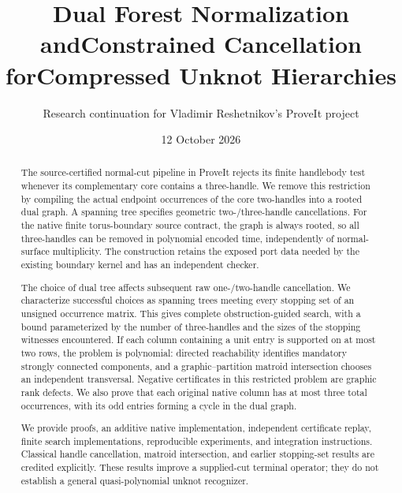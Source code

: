 \documentclass[11pt]{article}
\title{\color{navy}\bfseries Dual Forest Normalization and\newline Constrained Cancellation for\newline Compressed Unknot Hierarchies}
\author{Research continuation for Vladimir Reshetnikov's ProveIt project}
\date{12 October 2026}
\theoremstyle{definition}
\begin{document}
\maketitle
\begin{abstract}
The source-certified normal-cut pipeline in ProveIt rejects its finite
handlebody test whenever its complementary core contains a three-handle.
We remove this restriction by compiling the actual endpoint occurrences of
the core two-handles into a rooted dual graph.  A spanning tree specifies
geometric two-/three-handle cancellations.  For the native finite
torus-boundary source contract, the graph is always rooted, so all
three-handles can be removed in polynomial encoded time, independently of
normal-surface multiplicity.  The construction retains the exposed port
data needed by the existing boundary kernel and has an independent checker.

The choice of dual tree affects subsequent raw one-/two-handle cancellation.
We characterize successful choices as spanning trees meeting every stopping
set of an unsigned occurrence matrix.  This gives complete obstruction-guided
search, with a bound parameterized by the number of three-handles and the
sizes of the stopping witnesses encountered.  If each column containing
a unit entry is supported on at most two rows, the problem is polynomial: directed
reachability identifies mandatory strongly connected components, and a
graphic--partition matroid intersection chooses an independent transversal.
Negative certificates in this restricted problem are graphic rank defects.
We also prove that each original native column has at most three total
occurrences, with its odd entries forming a cycle in the dual graph.

We provide proofs, an additive native implementation, independent
certificate replay, finite search implementations, reproducible experiments,
and integration instructions.  Classical handle cancellation, matroid
intersection, and earlier stopping-set results are credited explicitly.
These results improve a supplied-cut terminal operator; they do not establish
a general quasi-polynomial unknot recognizer.
\end{abstract}
\tableofcontents
\newpage







\appendix

\clearpage
{}
{}


\end{document}
